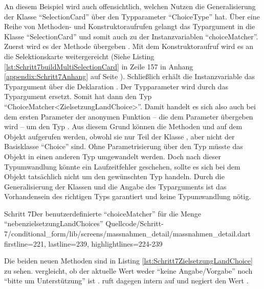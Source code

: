 An diesem Beispiel wird auch offensichtlich,
welchen Nutzen die Generalisierung der Klasse \enquote{SelectionCard} über den Typparameter \enquote{ChoiceType} hat.
Über eine Reihe von Methoden- und Konstruktoraufrufen gelangt das Typargument  in die Klasse \enquote{SelectionCard} und somit auch zu der Instanzvariablen \enquote{choiceMatcher}. Zuerst wird es der Methode  übergeben . 
Mit dem Konstruktoraufruf  wird es an die Selektionskarte weitergereicht (Siehe Listing \ref{lst:Schritt7buildMultiSelectionCard} in Zeile 157 in Anhang \ref{appendix:Schritt7Anhang} auf Seite \pageref{lst:Schritt7buildMultiSelectionCard}).
Schließlich erhält die Instanzvariable das Typargument über die Deklaration  .
Der Typparameter wird durch das Typargument ersetzt.
Somit hat  dann den Typ \enquote{ChoiceMatcher<ZielsetzungLandChoice>}.
Damit handelt es sich also auch bei dem ersten Parameter  der anonymen Funktion --
die dem Parameter  übergeben wird  -- um den Typ .
Aus diesem Grund können die Methoden   und   auf dem Objekt  aufgerufen werden,
obwohl sie nur Teil der Klasse , aber nicht der Basisklasse \enquote{Choice} sind.
Ohne Parametrisierung über den Typ müsste das Objekt  in einen anderen Typ umgewandelt werden.
Doch nach dieser Typumwandlung könnte ein Laufzeitfehler geschehen, sollte es sich bei dem Objekt tatsächlich nicht um den gewünschten Typ handeln.
Durch die Generalisierung der Klassen und die Angabe des Typarguments ist das Vorhandensein des richtigen Typs garantiert und keine Typumwandlung nötig.

\begin{alexlisting}{Schritt 7}{Der benutzerdefinierte \enquote{choiceMatcher} für die Menge \enquote{nebenzielsetzungLandChoices}}
  {Quellcode/Schritt-7/conditional_form/lib/screens/massnahmen_detail/massnahmen_detail.dart}
  {firstline=221, lastline=239, highlightlines={224-239}}
  \label{lst:Schritt7buildMultiSelectionCardZielsetzungLandChoice}
\end{alexlisting}

Die beiden neuen Methoden sind in Listing \ref{lst:Schritt7ZielsetzungLandChoice} zu sehen.  vergleicht, ob der aktuelle Wert weder \enquote{keine Angabe/Vorgabe} noch \enquote{bitte um Unterstützung} ist .
 ruft dagegen intern  auf und negiert den Wert .


